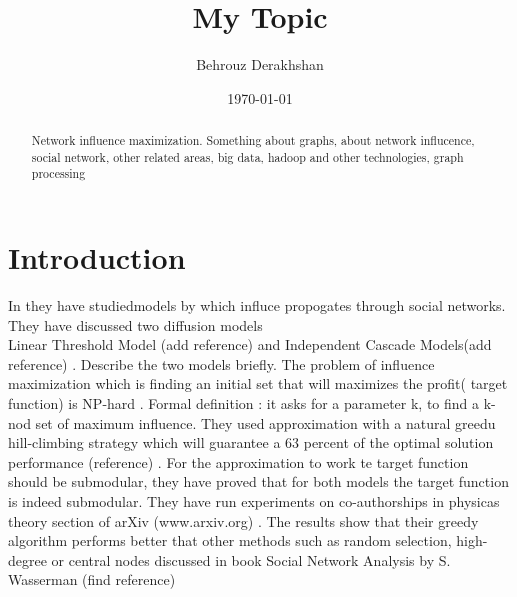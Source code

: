 \documentclass[english]{tktltiki}
\begin{document}
\onehalfspacing

\title{My Topic}
\author{Behrouz Derakhshan}
\date{\today}

\maketitle



\begin{abstract}

Network influence maximization. Something about graphs, about network influcence, social network, other related areas, big data, hadoop and other technologies, graph processing

\end{abstract}

\mytableofcontents




\section{Introduction}
In \cite{kempe03} they have studiedmodels by which influce propogates through social networks. They have discussed two diffusion models \\
Linear Threshold Model (add reference) and Independent Cascade Models(add reference) . Describe the two models briefly. 
The problem of influence maximization which is finding an initial set that will maximizes the profit( target function) is NP-hard . 
Formal definition : it asks for a parameter k, to find a k-nod set of maximum influence. They used approximation with a natural greedu hill-climbing strategy which will guarantee a 63 percent of the optimal solution performance (reference) . For the approximation to work te target function should be submodular, they have proved that for both models the target function is indeed submodular.  They have run experiments on co-authorships in physicas theory section of arXiv (www.arxiv.org) . The results show that their greedy algorithm performs better that other methods such as random selection, high-degree or central nodes discussed in book Social Network Analysis by S. Wasserman (find reference) 
\end{document}
